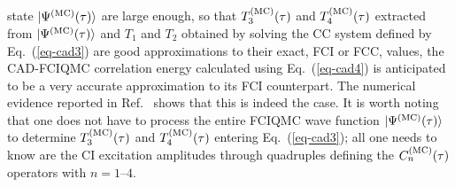 \documentclass[journal=jcp,manuscript=suppinfo]{achemso}
\begin{document}
state $|\Psi^{\rm (MC)}(\tau)\rangle$ are large enough, so that $T_{3}^{\rm (MC)}(\tau)$
and $T_{4}^{\rm (MC)}(\tau)$ extracted from $|\Psi^{\rm (MC)}(\tau)\rangle$
and $T_{1}$ and $T_{2}$ obtained by solving the CC system defined by Eq.\ (\ref{eq-cad3})
are good approximations to their exact, FCI or FCC, values,
the CAD-FCIQMC correlation energy calculated using Eq.\ (\ref{eq-cad4}) is anticipated
to be a very accurate approximation to its FCI counterpart. The numerical evidence
reported in Ref.\ 
shows that this is indeed the case. It is worth noting
that one does not have to process the entire FCIQMC wave function $|\Psi^{\rm (MC)}(\tau)\rangle$
to determine $T_{3}^{\rm (MC)}(\tau)$ and $T_{4}^{\rm (MC)}(\tau)$ entering
Eq.\ (\ref{eq-cad3}); all one needs to know are the CI excitation amplitudes through
quadruples defining the $C_{n}^{\rm (MC)}(\tau)$ operators with $n = \mbox{1--4}$.
\end{document}
